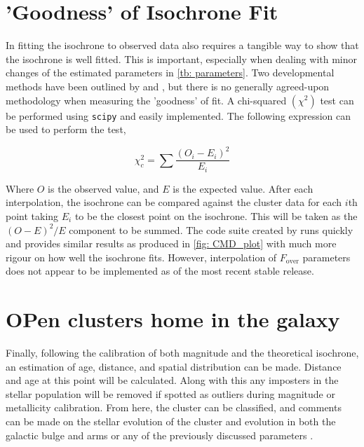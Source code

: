 \section{'Goodness' of Isochrone Fit}

In fitting the isochrone to observed data also requires a tangible way to show that the isochrone is well fitted. This is important, especially when dealing with minor changes of the estimated parameters in \cref{tb: parameters}. Two developmental methods have been outlined by \cite{2006MNRAS.373.1251N} and \cite{GoodnessValle}, but there is no generally agreed-upon methodology when measuring the  'goodness' of fit. A chi-squared $(\chi^2)$ test can be performed using \verb|scipy| and easily implemented. The following expression can be used to perform the test, 

\begin{equation}
    \chi^2_c = \sum \frac{(O_i - E_i)^2}{E_i}
\end{equation}

Where $O$ is the observed value, and $E$ is the expected value. After each interpolation, the isochrone can be compared against the cluster data for each $i$th point taking $E_i$ to be the closest point on the isochrone. This will be taken as the $(O - E)^2/E$ component to be summed. The code suite created by \cite{2006MNRAS.373.1251N} runs quickly and provides similar results as produced in \cref{fig: CMD_plot} with much more rigour on how well the isochrone fits. However, interpolation of $F_{\text{over}}$ parameters does not appear to be implemented as of the most recent stable release. 

\section{OPen clusters home in the galaxy}

Finally, following the calibration of both magnitude and the theoretical isochrone, an estimation of age, distance, and spatial distribution can be made. Distance and age at this point will be calculated. Along with this any imposters in the stellar population will be removed if spotted as outliers during magnitude or metallicity calibration. From here, the cluster can be classified, and comments can be made on the stellar evolution of the cluster and evolution in both the galactic bulge and arms or any of the previously discussed parameters \citep{review}. 
